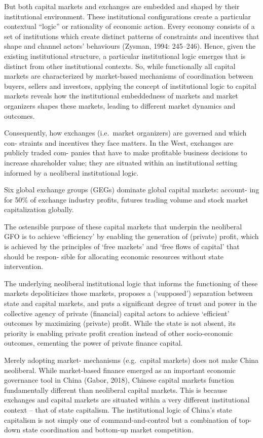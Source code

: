\documentclass[
]{book}
\begin{document}
But both capital markets and exchanges are embedded and shaped by their institutional
environment. These institutional configurations
create a particular contextual ``logic'' or rationality of economic action. Every economy
consists of a set of institutions which create distinct patterns of constraints and incentives
that shape and channel actors' behaviours (Zysman, 1994: 245--246). Hence, given the
existing institutional structure, a particular institutional logic emerges
that is distinct from
other institutional contexts. So, while functionally all capital
markets are characterized by market-based mechanisms of coordination between buyers,
sellers and investors, applying the concept of institutional logic to capital markets reveals
how the institutional embeddedness of markets and market organizers shapes these markets,
leading to different market dynamics and outcomes.

Consequently, how exchanges (i.e.~market organizers) are governed and which con-
straints and incentives they face matters. In the West, exchanges are publicly traded com-
panies that have to make profitable business decisions to increase shareholder value; they
are situated within an institutional setting informed by a neoliberal institutional logic.

Six global exchange groups (GEGs) dominate global capital markets: account-
ing for 50\% of exchange industry profits, futures trading volume and stock market
capitalization globally.

The ostensible purpose of these capital markets that underpin the neoliberal
GFO is to achieve `efficiency' by enabling the generation of (private) profit, which is
achieved by the principles of `free markets' and `free flows of capital' that should be respon-
sible for allocating economic resources without state intervention.

The underlying neoliberal institutional logic that informs the functioning of
these markets depoliticizes those
markets, proposes a (`supposed') separation between state and capital markets, and puts
a significant degree of trust and power in the collective agency of private (financial) capital
actors to achieve `efficient' outcomes by maximizing (private) profit.
While the state is not absent, its priority is enabling private profit creation
instead of other socio-economic outcomes, cementing the power of private finance capital.

Merely adopting market-
mechanisms (e.g.~capital markets) does not make China neoliberal. While market-based
finance emerged as an important economic governance tool in China (Gabor, 2018),
Chinese capital markets function fundamentally different than neoliberal capital markets.
This is because exchanges and capital markets are situated within a very different
institutional context -- that of state capitalism.
The institutional logic of China's state capitalism is
not simply one of command-and-control but a combination of top-down state coordination
and bottom-up market competition.
\end{document}
